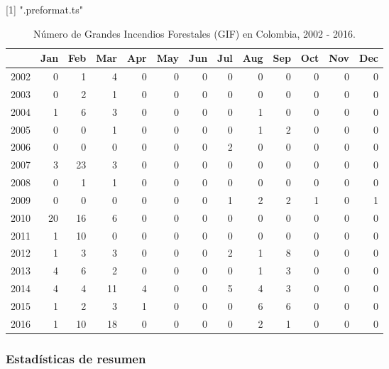 \documentclass[a4paper]{article}\usepackage[]{graphicx}\usepackage[]{color}
\begin{document}
[1] ".preformat.ts"
\begin{table}[ht]
\centering
\begin{tabular}{rrrrrrrrrrrrr}
  \hline
 & Jan & Feb & Mar & Apr & May & Jun & Jul & Aug & Sep & Oct & Nov & Dec \\ 
  \hline
2002 &   0 &   1 &   4 &   0 &   0 &   0 &   0 &   0 &   0 &   0 &   0 &   0 \\ 
  2003 &   0 &   2 &   1 &   0 &   0 &   0 &   0 &   0 &   0 &   0 &   0 &   0 \\ 
  2004 &   1 &   6 &   3 &   0 &   0 &   0 &   0 &   1 &   0 &   0 &   0 &   0 \\ 
  2005 &   0 &   0 &   1 &   0 &   0 &   0 &   0 &   1 &   2 &   0 &   0 &   0 \\ 
  2006 &   0 &   0 &   0 &   0 &   0 &   0 &   2 &   0 &   0 &   0 &   0 &   0 \\ 
  2007 &   3 &  23 &   3 &   0 &   0 &   0 &   0 &   0 &   0 &   0 &   0 &   0 \\ 
  2008 &   0 &   1 &   1 &   0 &   0 &   0 &   0 &   0 &   0 &   0 &   0 &   0 \\ 
  2009 &   0 &   0 &   0 &   0 &   0 &   0 &   1 &   2 &   2 &   1 &   0 &   1 \\ 
  2010 &  20 &  16 &   6 &   0 &   0 &   0 &   0 &   0 &   0 &   0 &   0 &   0 \\ 
  2011 &   1 &  10 &   0 &   0 &   0 &   0 &   0 &   0 &   0 &   0 &   0 &   0 \\ 
  2012 &   1 &   3 &   3 &   0 &   0 &   0 &   2 &   1 &   8 &   0 &   0 &   0 \\ 
  2013 &   4 &   6 &   2 &   0 &   0 &   0 &   0 &   1 &   3 &   0 &   0 &   0 \\ 
  2014 &   4 &   4 &  11 &   4 &   0 &   0 &   5 &   4 &   3 &   0 &   0 &   0 \\ 
  2015 &   1 &   2 &   3 &   1 &   0 &   0 &   0 &   6 &   6 &   0 &   0 &   0 \\ 
  2016 &   1 &  10 &  18 &   0 &   0 &   0 &   0 &   2 &   1 &   0 &   0 &   0 \\ 
   \hline
\end{tabular}
\caption{Número de Grandes Incendios Forestales (GIF) en Colombia, 2002 - 2016.} 
\end{table}


\subsubsection*{Estadísticas de resumen}
\end{document}
